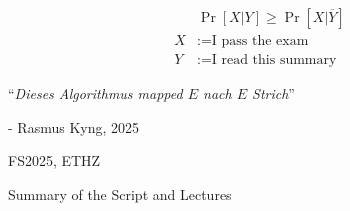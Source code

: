 \documentclass{article}
\begin{document}
\startDocument
\usetcolorboxes
\setcounter{numberingConfig}{3}

\vspace{2cm}
\begin{Huge}
    \begin{align*}
          & \Pr[X|Y] \geq \Pr[X|\overline{Y}] \\
        X & := \text{I pass the exam}         \\
        Y & := \text{I read this summary}
    \end{align*}
\end{Huge}


\vspace{4cm}
\begin{center}
    \begin{Large}
        ``\textit{Dieses Algorithmus mapped $E$ nach $E$ Strich}''
    \end{Large}

    \hspace{3cm} - Rasmus Kyng, 2025
\end{center}

\vspace{3cm}
\begin{center}
    FS2025, ETHZ\\[0.2cm]
    \begin{Large}
        Summary of the Script and Lectures
    \end{Large}\\[0.2cm]
\end{center}




\newpage
{}




























\end{document}
